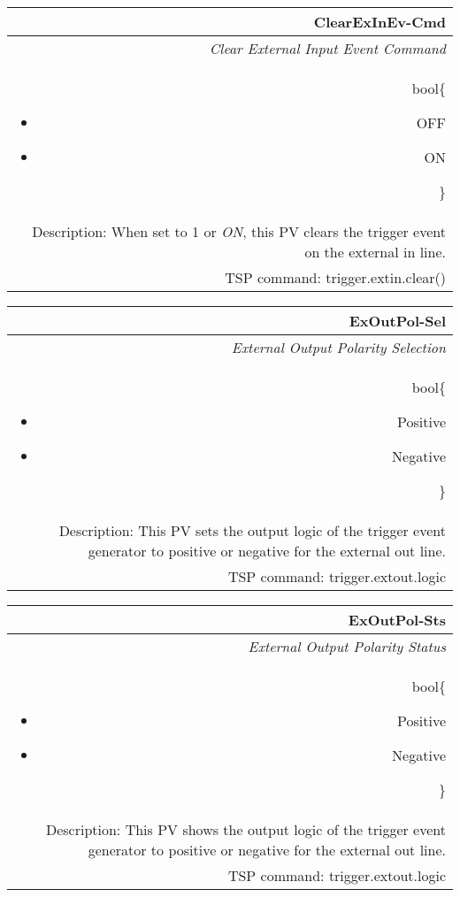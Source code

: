 \documentclass[openany]{article}
\begin{document}
		\begin{tabular}{N}
			\hline
			\bfseries ClearExInEv-Cmd\label{pv:clearexinev-cmd} \\ \hline
			\emph{Clear External Input Event Command} \\
			bool\{\begin{itemize}[noitemsep]
				\small
				\item[] OFF
				\item[] ON
			\end{itemize}\} \\
			Description: When set to 1 or \emph{ON}, this PV clears the trigger event on the external in line. \\
			TSP command: trigger.extin.clear()
		\end{tabular}

		\begin{tabular}{N}
			\hline
			\bfseries ExOutPol-Sel\label{pv:exoutpol-sel} \\ \hline
			\emph{External Output Polarity Selection} \\
			bool\{\begin{itemize}[noitemsep]
				\small
				\item[] Positive
				\item[] Negative
			\end{itemize}\} \\
			Description: This PV sets the output logic of the trigger event generator to positive or negative for the external out line. \\
			TSP command: trigger.extout.logic
		\end{tabular}

		\begin{tabular}{N}
			\hline
			\bfseries ExOutPol-Sts\label{pv:exoutpol-sts} \\ \hline
			\emph{External Output Polarity Status} \\
			bool\{\begin{itemize}[noitemsep]
				\small
				\item[] Positive
				\item[] Negative
			\end{itemize}\} \\
			Description: This PV shows the output logic of the trigger event generator to positive or negative for the external out line. \\
			TSP command: trigger.extout.logic
		\end{tabular}
\end{document}
